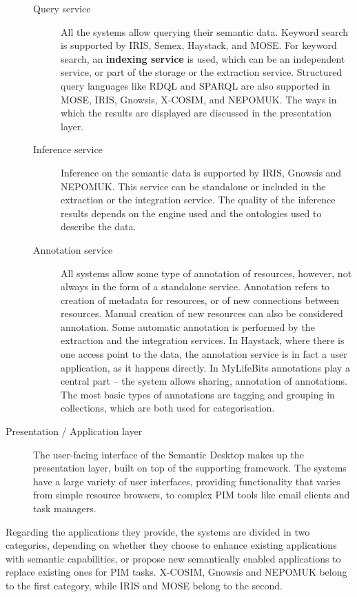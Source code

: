 \begin{description}
\begin{description}
 \item[Query service] All the systems allow querying their semantic data. Keyword search is supported by IRIS, Semex, Haystack, and MOSE. For keyword search, an \textbf{indexing service} is used, which can be an independent service, or part of the storage or the extraction service. Structured query languages like RDQL and SPARQL are also supported in MOSE, IRIS, Gnowsis, X-COSIM, and NEPOMUK. The ways in which the results are displayed are discussed in the presentation layer. 
 \item[Inference service] Inference on the semantic data is supported by IRIS, Gnowsis and NEPOMUK. This service can be standalone or included in the extraction or the integration service. The quality of the inference results depends on the engine used and the ontologies used to describe the data. 
 \item[Annotation service] All systems allow some type of annotation of resources, however, not always in the form of a standalone service. Annotation refers to creation of metadata for resources, or of new connections between resources. Manual creation of new resources can also be considered annotation. Some automatic annotation is performed by the extraction and the integration services. In Haystack, where there is one access point to the data, the annotation service is in fact a user application, as it happens directly. In MyLifeBits annotations play a central part -- the system allows sharing, annotation of annotations. The most basic types of annotations are tagging and grouping in collections, which are both used for categorisation.
\end{description}
\item[Presentation / Application layer] The user-facing interface of the Semantic Desktop makes up the presentation layer, built on top of the supporting framework. The systems have a large variety of user interfaces, providing functionality that varies from simple resource browsers, to complex PIM tools like email clients and task managers. 
\end{description}

Regarding the applications they provide, the systems are divided in two categories, depending on whether they choose to enhance existing applications with semantic capabilities, or propose new semantically enabled applications to replace existing ones for PIM tasks. X-COSIM, Gnowsis and NEPOMUK belong to the first category, while IRIS and MOSE belong to the second.

